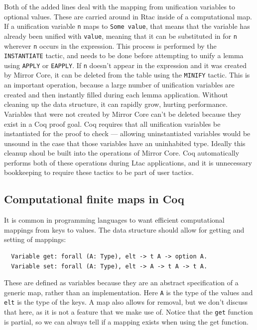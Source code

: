 \documentclass{puthesis}
\begin{document}
Both of the added lines deal with the mapping from unification variables to
optional values. These are carried around in Rtac inside of a
computational map. If a unification variable \lstinline|n| maps to
\lstinline|Some value|, that means that the variable has already been
unified with \lstinline|value|, meaning that it can be substituted in
for \lstinline|n| wherever \lstinline|n| occurs in the
expression. This process is performed by the \lstinline|INSTANTIATE|
tactic, and needs to be done before attempting to unify a lemma using
\lstinline|APPLY| or \lstinline|EAPPLY|. If \lstinline|n| doesn't
appear in the expression and it was created by Mirror Core, it can be
deleted from the table using the \lstinline|MINIFY| tactic. This is an
important operation, because a large number of unification variables
are created and then instantly filled during each lemma
application. Without cleaning up the data structure, it can rapidly
grow, hurting performance. Variables that were not created by Mirror
Core can't be deleted because they exist in a Coq proof goal. Coq
requires that all unification variables be instantiated for the proof
to check --- allowing uninstantiated variables would be unsound in
the case that those variables have an uninhabited type. Ideally this
cleanup shoul be built into the operations
of Mirror Core. Coq automatically performs both of these operations
during Ltac applications, and it is unnecessary bookkeeping to require
these tactics to be part of user tactics.

\subsection{Computational finite maps in Coq}
\label{sec:ptrees}
It is common in programming languages to want efficient computational
mappings from keys to values. The data structure should allow for
getting and setting of mappings:

\begin{lstlisting}
  Variable get: forall (A: Type), elt -> t A -> option A.
  Variable set: forall (A: Type), elt -> A -> t A -> t A.
\end{lstlisting}

These are defined as variables because they are an abstract
specification of a generic map, rather than an implementation. Here
\lstinline|A| is the type of the values and \lstinline|elt| is the
type of the keys. A map also allows for removal, but we
don't discuss that here, as it is not a feature that we make use
of. Notice that the \lstinline|get| function is partial, so we can
always tell if a mapping exists when using the get function.
\end{document}

